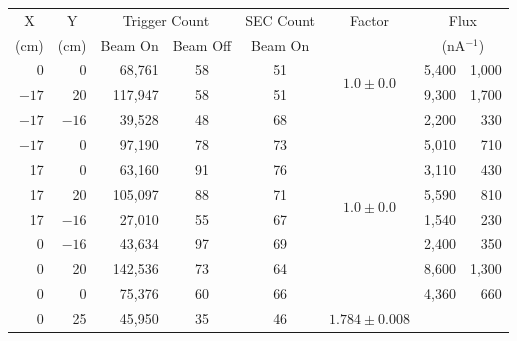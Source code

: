\begin{table}
  \begin{center}
    \begin{tabular}{r|r|r|c|c|c|r@{~\(\pm\)~}r}
      \multicolumn{1}{c|}{X}     &   \multicolumn{1}{c|}{Y}    &  \multicolumn{2}{c|}{Trigger Count}  &  \multicolumn{1}{c|}{SEC Count}  &  \multicolumn{1}{c|}{Factor}  &  \multicolumn{2}{c}{Flux}     \\
      \multicolumn{1}{c|}{(cm)}  &  \multicolumn{1}{c|}{(cm)}  &         \multicolumn{1}{c|}{Beam On}  &  \multicolumn{1}{c|}{Beam Off}         &  \multicolumn{1}{c|}{Beam On}    &          &  \multicolumn{2}{c}{(nA\(^{-1}\))}   \\
      \hline
        0      &    0      &           68,761 & 58                &   51        &  \multirow{2}{*}{\(1.0\pm0.0\)}
                                                                                           &   5,400  &  1,000 \\
      \(-17\)  &   20      &          117,947 & 58                &   51        &          &   9,300  &  1,700 \\
      \hline
      \(-17\)  &  \(-16\)  &           39,528 & 48                &   68        & \multirow{8}{*}{\(1.0\pm0.0\)}  
                                                                                           &   2,200  &    330 \\
      \(-17\)  &    0      &           97,190 & 78                &   73        &          &   5,010  &    710 \\
       17      &    0      &           63,160 & 91                &   76        &          &   3,110  &    430 \\
       17      &   20      &          105,097 & 88                &   71        &          &   5,590  &    810 \\
       17      &  \(-16\)  &           27,010 & 55                &   67        &          &   1,540  &    230 \\
        0      &  \(-16\)  &           43,634 & 97                &   69        &          &   2,400  &    350 \\
        0      &   20      &          142,536 & 73                &   64        &          &   8,600  &  1,300 \\
        0      &    0      &           75,376 & 60                &   66        &          &   4,360  &    660 \\
      \hline
         0      &   25     &           45,950 & 35                &   46        &   \multirow{3}{*}{\(1.784\pm0.008\)}

\end{tabular}
\end{center}
\end{table}
